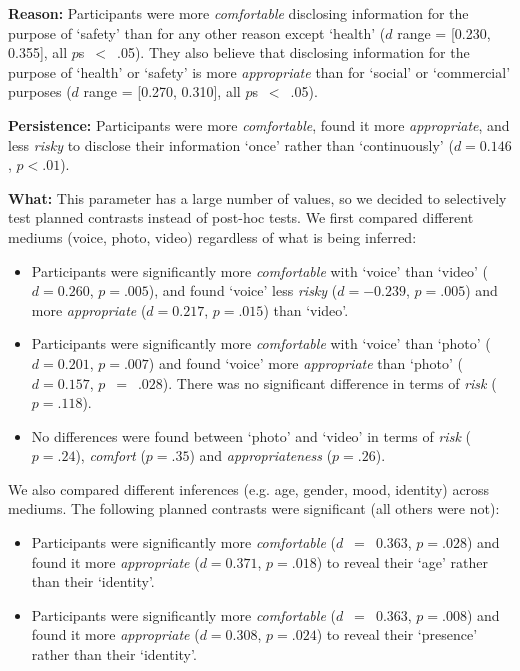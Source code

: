 \textbf{Reason:} Participants were more \emph{comfortable} disclosing information for the purpose of `safety' than for any other reason except `health' ($d$ range = [0.230, 0.355], all $p$s~$<$~.05). They also believe that disclosing information for the purpose of `health' or `safety' is more \emph{appropriate} than for `social' or `commercial' purposes ($d$ range = [0.270, 0.310], all $p$s~$<$~.05).

\textbf{Persistence:} Participants were more \emph{comfortable}, found it more \emph{appropriate}, and less \emph{risky} to disclose their information `once' rather than `continuously' ($d = 0.146$, $p < .01$).

\textbf{What:} This parameter has a large number of values, so we decided to selectively test planned contrasts instead of post-hoc tests. We first compared different mediums (voice, photo, video) regardless of what is being inferred:
\begin{itemize}
\item Participants were significantly more \emph{comfortable} with `voice' than `video' ($d = 0.260$, $p = .005$), and found `voice' less \emph{risky} ($d = -0.239$, $p = .005$) and more \emph{appropriate} ($d = 0.217$, $p = .015$) than `video'.
\item Participants were significantly more \emph{comfortable} with `voice' than `photo' ($d=0.201$, $p = .007$) and found `voice' more \emph{appropriate} than `photo' ($d = 0.157$, $p$~$=$~$.028$). There was no significant difference in terms of \emph{risk} ($p = .118$).
\item No differences were found between `photo' and `video' in terms of \emph{risk} ($p = .24$), \emph{comfort} ($p = .35$) and \emph{appropriateness} ($p = .26$).
\end{itemize}

We also compared different inferences (e.g. age, gender, mood, identity) across mediums. The following planned contrasts were significant (all others were not):
\begin{itemize}
\item Participants were significantly more \emph{comfortable} ($d$~$=$~$0.363$, $p = .028$) and found it more \emph{appropriate} ($d = 0.371$, $p = .018$) to reveal their `age' rather than their `identity'.
\item Participants were significantly more \emph{comfortable} ($d$~$=$~$0.363$, $p= .008$) and found it more \emph{appropriate} ($d = 0.308$, $p = .024$) to reveal their `presence' rather than their `identity'.
\end{itemize}

